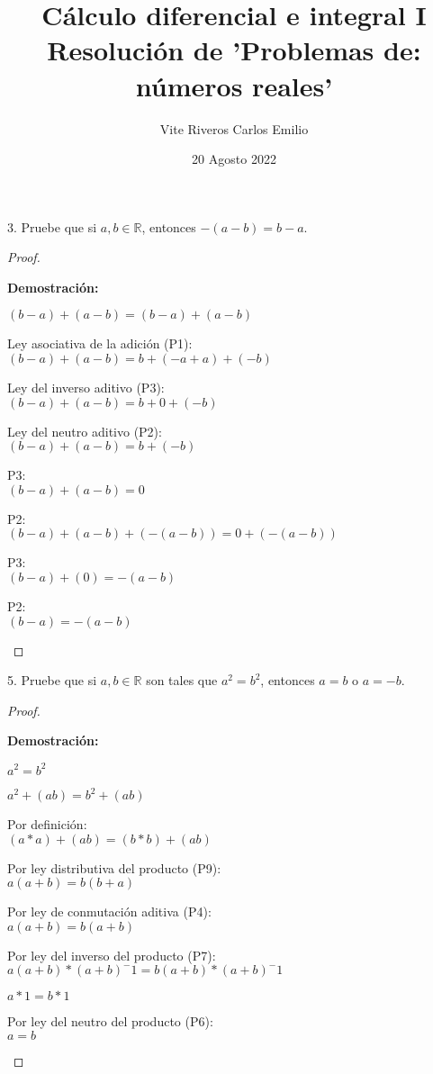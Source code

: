 \documentclass[12pt, a4paper]{article}
\title{Cálculo diferencial e integral I\\Resolución de 'Problemas de: números reales'}
\author{Vite Riveros Carlos Emilio}
\date{20 Agosto 2022}
\begin{document}
\maketitle

3. Pruebe que si $a,b \in \mathbb{R}$, entonces $-(a-b) = b-a$.
    \begin{proof}
        \begin{center}
            \textbf{Demostración:}

            $(b-a)+(a-b)=(b-a)+(a-b)$

            Ley asociativa de la adición (P1):\\
            $(b-a)+(a-b)=b+(-a+a)+(-b)$

            Ley del inverso aditivo (P3):\\
            $(b-a)+(a-b)=b+0+(-b)$

            Ley del neutro aditivo (P2):\\
            $(b-a)+(a-b)=b+(-b)$

            P3:\\
            $(b-a)+(a-b)=0$

            P2:\\
            $(b-a)+(a-b)+(-(a-b))=0+(-(a-b))$

            P3:\\
            $(b-a)+(0)=-(a-b)$

            P2:\\
            $(b-a)=-(a-b)$

        \end{center}
    \end{proof}
        
5. Pruebe que si $a,b \in \mathbb{R}$ son tales que $a^2 = b^2$, entonces $a = b$ o $a = -b$.
    \begin{proof}
        \begin{center}
            \textbf{Demostración:}

            $a^2=b^2$

            $a^2+(ab)=b^2+(ab)$

            Por definición:\\
            $(a*a)+(ab)=(b*b)+(ab)$

            Por ley distributiva del producto (P9):\\
            $a(a+b)=b(b+a)$

            Por ley de conmutación aditiva (P4):\\
            $a(a+b)=b(a+b)$

            Por ley del inverso del producto (P7):\\
            $a(a+b)*(a+b)^-1=b(a+b)*(a+b)^-1$

            $a*1=b*1$

            Por ley del neutro del producto (P6):\\ 
            $a=b$

        \end{center}
    \end{proof}
\end{document}
